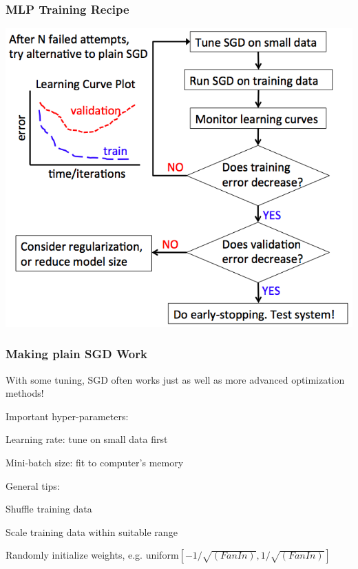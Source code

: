 \begin{frame}
\frametitle{MLP Training Recipe}
\centerline{\includegraphics[scale=0.42]{figs/training_recipe}}
\end{frame}

\begin{frame}
\frametitle{Making plain SGD Work}
\bi
\item With some tuning, SGD often works just as well as more advanced optimization methods! \pause
\item Important hyper-parameters: 
	\bi
	\item Learning rate: tune on small data first
	\item Mini-batch size: fit to computer's memory
	\ei 
	\pause
\item General tips:
	\bi
	\item Shuffle training data
	\item Scale training data within suitable range 
	\item Randomly initialize weights, e.g. uniform$[-1/\sqrt{(FanIn)}, 1/\sqrt{(FanIn)}]$
	\ei
\ei	
\end{frame}


